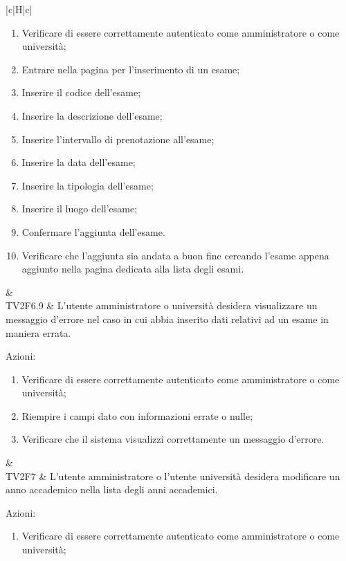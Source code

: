 \begin{longtable}{|c|H|c|}
\begin{flushleft}
		\end{flushleft}
		\begin{enumerate}
			\item Verificare di essere correttamente autenticato come amministratore o come università;
			\item Entrare nella pagina per l'inserimento di un esame;
			\item Inserire il codice dell'esame;
			\item Inserire la descrizione dell'esame;
			\item Inserire l'intervallo di prenotazione all'esame;
			\item Inserire la data dell'esame;
			\item Inserire la tipologia dell'esame;
			\item Inserire il luogo dell'esame;
			\item Confermare l'aggiunta dell'esame.
			\item Verificare che l'aggiunta sia andata a buon fine cercando l'esame appena aggiunto nella pagina dedicata alla lista degli esami.
		\end{enumerate} & \Ts \\
	\hline
	TV2F6.9 & L'utente amministratore o università desidera visualizzare un messaggio d'errore nel caso in cui abbia inserito dati relativi ad un esame in maniera errata. \newline \begin{flushleft}
		Azioni:\newline
	\end{flushleft} 
	\begin{enumerate}
		\item Verificare di essere correttamente autenticato come amministratore o come università;
		\item Riempire i campi dato con informazioni errate o nulle;
		\item Verificare che il sistema visualizzi correttamente un messaggio d'errore.
	\end{enumerate} & \Ts \\
	\hline
	TV2F7 & L'utente amministratore o l'utente università desidera modificare un anno accademico nella lista degli anni accademici. \newline \begin{flushleft}
		Azioni:\newline
	\end{flushleft} 
	\begin{enumerate}
		\item Verificare di essere correttamente autenticato come amministratore o come università;

\end{enumerate}
\end{longtable}
